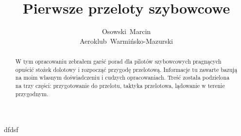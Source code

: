 \documentclass{article}
\title{Pierwsze przeloty szybowcowe}
\author{Osowski~Marcin\\Aeroklub~Warmińsko-Mazurski}
\begin{document}
\maketitle
\newpage

\begin{abstract}
W tym opracowaniu zebrałem garść porad dla pilotów szybowcowych pragnących
opuścić stożek dolotowy i rozpocząć przygodę przelotową. Informacje tu zawarte
bazują na moim własnym doświadczeniu i cudzych opracowaniach. Treść została
podzielona na trzy części: przygotowanie do przelotu, taktyka przelotowa, 
lądowanie w terenie przygodnym.
\end{abstract}
\newpage




dfdsf
\end{document}
